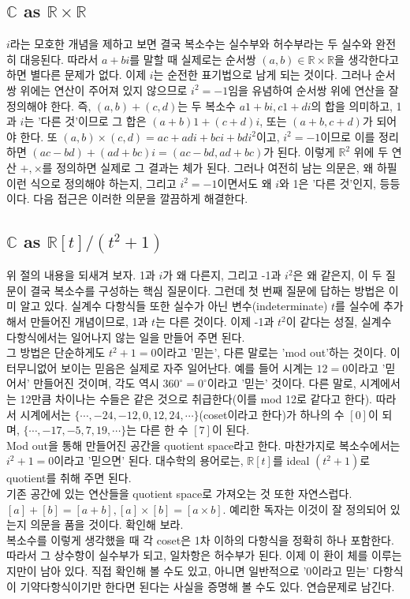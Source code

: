 \subsection{\texorpdfstring{$\mathbb{C}$}{C} as \texorpdfstring{$\mathbb{R}\times\mathbb{R}$}{RxR}}
$i$라는 모호한 개념을 제하고 보면 결국 복소수는 실수부와 허수부라는 두 실수와 완전히 대응된다. 따라서 $a+bi$를 말할 때 실제로는 순서쌍 $(a, b)\in \mathbb{R}\times\mathbb{R}$을 생각한다고 하면 별다른 문제가 없다. 이제 $i$는 순전한 표기법으로 남게 되는 것이다. 그러나 순서쌍 위에는 연산이 주어져 있지 않으므로 $i^2=-1$임을 유념하여 순서쌍 위에 연산을 잘 정의해야 한다. 
즉, $(a, b)+(c, d)$는 두 복소수 $a1+bi, c1+di$의 합을 의미하고, 1과 $i$는 '다른 것'이므로 그 합은 $(a+b)1+(c+d)i$, 또는 $(a+b, c+d)$가 되어야 한다. 또 $(a, b)\times(c, d)=ac+adi+bci+bdi^2$이고, $i^2=-1$이므로 이를 정리하면 $(ac-bd)+(ad+bc)i=(ac-bd, ad+bc)$가 된다. 이렇게 $\mathbb{R}^2$ 위에 두 연산 $+, \times$를 정의하면 실제로 그 결과는 체가 된다. 그러나 여전히 남는 의문은, 왜 하필 이런 식으로 정의해야 하는지, 그리고 $i^2=-1$이면서도 왜 $i$와 1은 '다른 것'인지, 등등이다. 다음 접근은 이러한 의문을 깔끔하게 해결한다. 
\subsection{\texorpdfstring{$\mathbb{C}$}{C} as \texorpdfstring{$\mathbb{R}[t]/(t^2+1)$}{R[t]/t**2+1}}
위 절의 내용을 되새겨 보자. 1과 $i$가 왜 다른지, 그리고 -1과 $i^2$은 왜 같은지, 이 두 질문이 결국 복소수를 구성하는 핵심 질문이다. 
그런데 첫 번째 질문에 답하는 방법은 이미 알고 있다. 실계수 다항식들 또한 실수가 아닌 변수(indeterminate) $t$를 실수에 추가해서 만들어진 개념이므로, 1과 $t$는 다른 것이다. 이제 -1과 $t^2$이 같다는 성질, 실계수 다항식에서는 일어나지 않는 일을 만들어 주면 된다. \\
그 방법은 단순하게도 $t^2+1=0$이라고 '믿는', 다른 말로는 'mod out'하는 것이다. 이 터무니없어 보이는 믿음은 실제로 자주 일어난다. 예를 들어 시계는 $12=0$이라고 '믿어서' 만들어진 것이며, 각도 역시 $360^\circ=0^\circ$이라고 '믿는' 것이다. 다른 말로, 시계에서는 12만큼 차이나는 수들은 같은 것으로 취급한다(이를 mod 12로 같다고 한다). 따라서 시계에서는 $\{\cdots,-24, -12, 0, 12, 24, \cdots\}$(coset이라고 한다)가 하나의 수 $[0]$이 되며, $\{\cdots, -17, -5, 7, 19, \cdots\}$는 다른 한 수 $[7]$이 된다. \\Mod out을 통해 만들어진 공간을 quotient space라고 한다. 마찬가지로 복소수에서는 $i^2+1=0$이라고 '믿으면' 된다. 대수학의 용어로는, $\mathbb{R}[t]$를 ideal $(t^2+1)$로 quotient를 취해 주면 된다. \\
기존 공간에 있는 연산들을 quotient space로 가져오는 것 또한 자연스럽다. $[a]+[b]=[a+b], [a]\times [b]=[a\times b]$. 예리한 독자는 이것이 잘 정의되어 있는지 의문을 품을 것이다. 확인해 보라. \\
복소수를 이렇게 생각했을 때 각 coset은 1차 이하의 다항식을 정확히 하나 포함한다. 따라서 그 상수항이 실수부가 되고, 일차항은 허수부가 된다. 이제 이 환이 체를 이루는지만이 남아 있다. 직접 확인해 볼 수도 있고, 아니면 일반적으로 '0이라고 믿는' 다항식이 기약다항식이기만 한다면 된다는 사실을 증명해 볼 수도 있다. 연습문제로 남긴다. 

